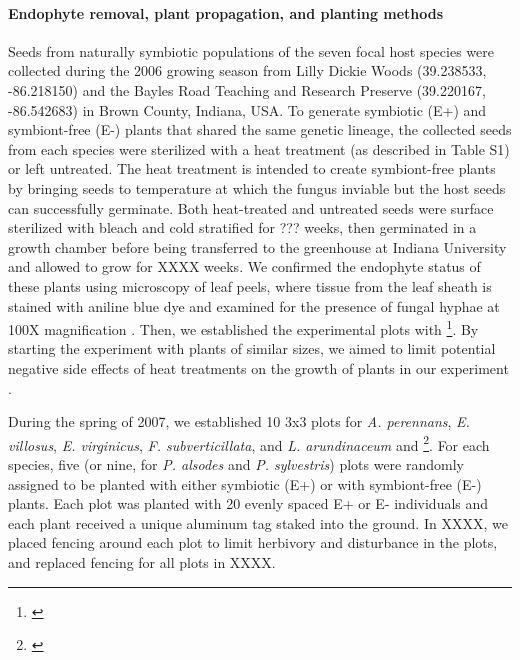 \documentclass[12pt]{article}
\newcommand{\tom}[2]{{\color{red}{#1}}\footnote{\textit{\color{red}{#2}}}}
\begin{document}
\paragraph*{Endophyte removal, plant propagation, and planting methods}
Seeds from naturally symbiotic populations of the seven focal host species were collected during the 2006 growing season from Lilly Dickie Woods (39.238533, -86.218150) and the Bayles Road Teaching and Research Preserve (39.220167, -86.542683) in Brown County, Indiana, USA. 
To generate symbiotic (E+) and symbiont-free (E-) plants that shared the same genetic lineage, the collected seeds from each species were sterilized with a heat treatment (as described in Table S1) or left untreated. 
The heat treatment is intended to create symbiont-free plants by bringing seeds to temperature at which the fungus inviable but the host seeds can successfully germinate.
Both heat-treated and untreated seeds were surface sterilized with bleach and cold stratified for {\color{red}??? weeks}, then germinated in a growth chamber before being transferred to the greenhouse at Indiana University and allowed to grow for XXXX weeks. 
We confirmed the endophyte status of these plants using microscopy of leaf peels, where tissue from the leaf sheath is stained with aniline blue dye and examined for the presence of fungal hyphae at 100X magnification \cite{bacon2018stains}. 
Then, we established the experimental plots with \tom{vegetatively propogated clones of similar sizes from the plants}{not sure this happened}. 
By starting the experiment with plants of similar sizes, we aimed to limit potential negative side effects of heat treatments on the growth of plants in our experiment \cite{rudgers2009benefits}.

During the spring of 2007, we established 10 3x3 plots for \emph{A. perennans}, \emph{E. villosus}, \emph{E. virginicus}, \emph{F. subverticillata}, and \emph{L. arundinaceum}  and \tom{18 plots for \emph{P. alsodes} and \emph{P. sylvestris}}{I think one set was started in 2007 and another in 2008.}. 
For each species, five (or nine, for \emph{P. alsodes} and \emph{P. sylvestris}) plots were randomly assigned to be planted with either symbiotic (E+) or with symbiont-free (E-) plants.
Each plot was planted with 20 evenly spaced E+ or E- individuals and each plant received a unique aluminum tag staked into the ground. 
In XXXX, we placed fencing around each plot to limit herbivory and disturbance in the plots, and replaced fencing for all plots in XXXX.
\end{document}
